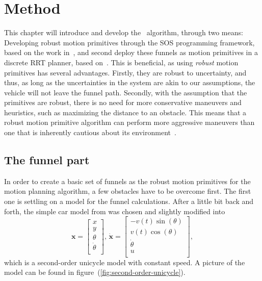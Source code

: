 \chapter{Method}

This chapter will introduce and develop the \rrtfunnel\ algorithm, through two
means: Developing robust motion primitives through the \ac{SOS} programming
framework, based on the work in~\cite{majumdarFunnelLibrariesRealtime2017}, and
second deploy these funnels as motion primitives in a discrete \ac{RRT} planner,
based on~\cite{lavalleLav98cPdf}. This is beneficial, as using \textit{robust}
motion primitives has several advantages. Firstly, they are robust to
uncertainty, and thus, as long as the uncertainties in the system are akin to
our assumptions, the vehicle will not leave the funnel path. Secondly, with the
assumption that the primitives are robust, there is no need for more
conservative maneuvers and heuristics, such as maximizing the distance to an
obstacle. This means that a robust motion primitive algorithm can perform more
aggressive maneuvers than one that is inherently cautious about its
environment~\cite{majumdarFunnelLibrariesRealtime2017}.

\section{The funnel part}

In order to create a basic set of funnels as the robust motion primitives for
the \rrtfunnel{} motion planning algorithm, a few obstacles have to be overcome
first. The first one is settling on a model for the funnel calculations. After a
little bit back and forth, the simple car model from \cite[LaValle.p~613]{Lav06} was
chosen and slightly modified into
\begin{equation}
  \label{eq:model-dynamics}
  \mathbf{x} =
  \begin{bmatrix}
    x \\ y \\ \theta \\ \dot{\theta} \\
  \end{bmatrix}, \,
  \dot{\mathbf{x}}  =
  \begin{bmatrix}
    -v(t)\sin(\theta) \\
    v(t)\cos(\theta) \\
    \dot{\theta} \\
    u \\
  \end{bmatrix},
\end{equation}
which is a second-order unicycle model with constant speed. A picture of the
model can be found in figure~(\ref{fig:second-order-unicycle}).

